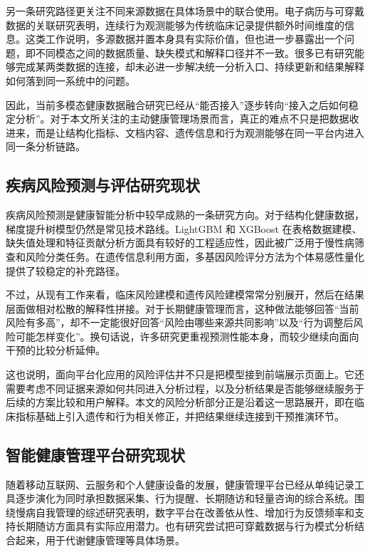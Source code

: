 另一条研究路径更关注不同来源数据在具体场景中的联合使用。电子病历与可穿戴数据的关联研究表明，连续行为观测能够为传统临床记录提供额外时间维度的信息\cite{epstein2023ehrwearable}。这类工作说明，多源数据并置本身具有实际价值，但也进一步暴露出一个问题，即不同模态之间的数据质量、缺失模式和解释口径并不一致。很多已有研究能够完成某两类数据的连接，却未必进一步解决统一分析入口、持续更新和结果解释如何落到同一系统中的问题。

因此，当前多模态健康数据融合研究已经从“能否接入”逐步转向“接入之后如何稳定分析”。对于本文所关注的主动健康管理场景而言，真正的难点不只是把数据收进来，而是让结构化指标、文档内容、遗传信息和行为观测能够在同一平台内进入同一条分析链路。

\subsection{疾病风险预测与评估研究现状}

疾病风险预测是健康智能分析中较早成熟的一条研究方向。对于结构化健康数据，梯度提升树模型仍然是常见技术路线。LightGBM 和 XGBoost 在表格数据建模、缺失值处理和特征贡献分析方面具有较好的工程适应性，因此被广泛用于慢性病筛查和风险分类任务\cite{ke2017lightgbm,chen2016xgboost}。在遗传信息利用方面，多基因风险评分方法为个体易感性量化提供了较稳定的补充路径\cite{choi2019prsice2}。

不过，从现有工作来看，临床风险建模和遗传风险建模常常分别展开，然后在结果层面做相对松散的解释性拼接。对于长期健康管理而言，这种做法能够回答“当前风险有多高”，却不一定能很好回答“风险由哪些来源共同影响”以及“行为调整后风险可能怎样变化”。换句话说，许多研究更重视预测性能本身，而较少继续向面向干预的比较分析延伸。

这也说明，面向平台化应用的风险评估并不只是把模型接到前端展示页面上。它还需要考虑不同证据来源如何共同进入分析过程，以及分析结果是否能够继续服务于后续的方案比较和用户解释。本文的风险分析部分正是沿着这一思路展开，即在临床指标基础上引入遗传和行为相关修正，并把结果继续连接到干预推演环节。

\subsection{智能健康管理平台研究现状}

随着移动互联网、云服务和个人健康设备的发展，健康管理平台已经从单纯记录工具逐步演化为同时承担数据采集、行为提醒、长期随访和轻量咨询的综合系统。围绕慢病自我管理的综述研究表明，数字平台在改善依从性、增加行为反馈频率和支持长期随访方面具有实际应用潜力\cite{sockolow2021mhealth}。也有研究尝试把可穿戴数据与行为模式分析结合起来，用于代谢健康管理等具体场景\cite{zahedani2023digital}。

